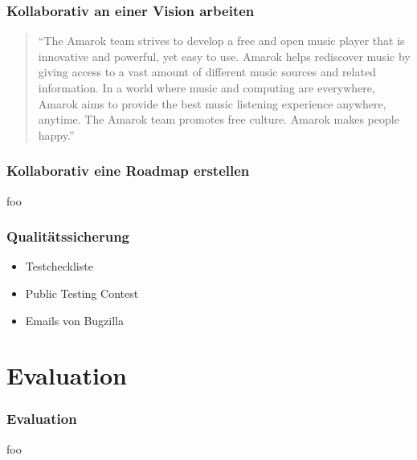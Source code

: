 \documentclass{beamer}
\begin{document}
\begin{frame}
\frametitle{Kollaborativ an einer Vision arbeiten}
\begin{quotation}``The Amarok team strives to develop a free and open music player that is innovative and powerful, yet easy to use. Amarok helps rediscover music by giving access to a vast amount of different music sources and related information. In a world where music and computing are everywhere, Amarok aims to provide the best music listening experience anywhere, anytime. The Amarok team promotes free culture. Amarok makes people happy.''\end{quotation}
\end{frame}

\begin{frame}
\frametitle{Kollaborativ eine Roadmap erstellen}
foo
\end{frame}

\begin{frame}
\frametitle{Qualit\"atssicherung}
\begin{itemize}
 \item Testcheckliste
 \item Public Testing Contest
 \item Emails von Bugzilla
\end{itemize}
\end{frame}

\section{Evaluation}

\begin{frame}
\frametitle{Evaluation}
foo
\end{frame}
\end{document}
